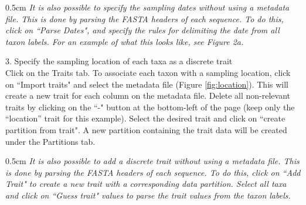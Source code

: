 \documentclass{article}
\newcommand{\ann}[1]{
\begin{adjustwidth}{0.5cm}{}
\it{#1}\\
\end{adjustwidth}}
\begin{document}
\ann{It is also possible to specify the sampling dates without using a metadata file. This is done by parsing the FASTA headers of each sequence. To do this, click on ``Parse Dates", and specify the rules for delimiting the date from all taxon labels. For an example of what this looks like, see \cite{skyprot} Figure 2a. } %

3. Specify the sampling location of each taxa as a discrete trait\\

Click on the Traits tab.
To associate each taxon with a sampling location, click on ``Import traits" and select the metadata file (Figure \ref{fig:location}). %
This will create a new trait for each column on the metadata file. Delete all non-relevant traits by clicking on the ``-" button at the bottom-left of the page (keep only the ``location'' trait for this example). Select the desired trait and click on ``create partition from trait". A new partition containing the trait data will be created under the Partitions tab.\\ %

\ann{It is also possible to add a discrete trait without using a metadata file. This is done by parsing the FASTA headers of each sequence. To do this, click on ``Add Trait" to create a new trait with a corresponding data partition. Select all taxa and click on ``Guess trait" values to parse the trait values from the taxon labels.}
\end{document}
